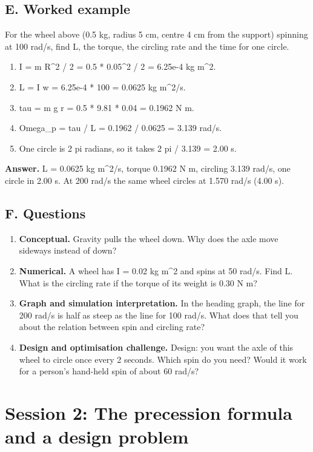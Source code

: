 \documentclass[11pt,a4paper]{article}
\begin{document}
\subsection*{E. Worked example}
For the wheel above (0.5 kg, radius 5 cm, centre 4 cm from the support) spinning at 100 rad/s, find L, the torque, the circling rate and the time for one circle.
\begin{enumerate}[nosep]
\item I = m R\textasciicircum{}2 / 2 = 0.5 * 0.05\textasciicircum{}2 / 2 = 6.25e-4 kg m\textasciicircum{}2.
\item L = I w = 6.25e-4 * 100 = 0.0625 kg m\textasciicircum{}2/s.
\item tau = m g r = 0.5 * 9.81 * 0.04 = 0.1962 N m.
\item Omega\_p = tau / L = 0.1962 / 0.0625 = 3.139 rad/s.
\item One circle is 2 pi radians, so it takes 2 pi / 3.139 = 2.00 s.
\end{enumerate}
\textbf{Answer.} L = 0.0625 kg m\textasciicircum{}2/s, torque 0.1962 N m, circling 3.139 rad/s, one circle in 2.00 s. At 200 rad/s the same wheel circles at 1.570 rad/s (4.00 s).

\subsection*{F. Questions}
\begin{enumerate}[nosep]
\item \textbf{Conceptual.} Gravity pulls the wheel down. Why does the axle move sideways instead of down?
\item \textbf{Numerical.} A wheel has I = 0.02 kg m\textasciicircum{}2 and spins at 50 rad/s. Find L. What is the circling rate if the torque of its weight is 0.30 N m?
\item \textbf{Graph and simulation interpretation.} In the heading graph, the line for 200 rad/s is half as steep as the line for 100 rad/s. What does that tell you about the relation between spin and circling rate?
\item \textbf{Design and optimisation challenge.} Design: you want the axle of this wheel to circle once every 2 seconds. Which spin do you need? Would it work for a person's hand-held spin of about 60 rad/s?
\end{enumerate}

\section{Session 2: The precession formula and a design problem}
\end{document}

